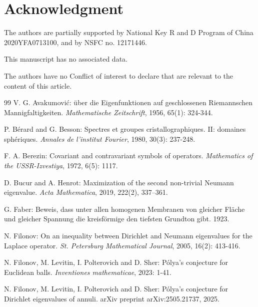 \documentclass[11pt,letterpaper]{amsart}
\numberwithin{equation}{section}
\theoremstyle{plain}
\theoremstyle{plain}
\numberwithin{equation}{section}
\theoremstyle{remark}
\begin{document}
\section*{Acknowledgment}

 The authors are partially supported by  National Key R and D Program of China 2020YFA0713100, and by NSFC no. 12171446.

 This manuscript has no associated data.

  The authors have no Conflict of interest to declare that are relevant to the content of this article.



\begin{thebibliography}{99}
	V. G. Avakumovi{\'c}: {\"u}ber die Eigenfunktionen auf geschlossenen Riemannschen Mannigfaltigkeiten. \emph{Mathematische Zeitschrift}, 1956, 65(1): 324-344.
	
	P. B\'erard and G. Besson: Spectres et groupes cristallographiques. II: domaines sph\'eriques. \emph{Annales de l'institut Fourier}, 1980, 30(3): 237-248.
	
	F. A. Berezin: Covariant and contravariant symbols of operators. \emph{Mathematics of the USSR-Izvestiya}, 1972, 6(5): 1117.
	
	D. Bucur and A. Henrot: Maximization of the second non-trivial Neumann eigenvalue. \emph{Acta Mathematica}, 2019, 222(2), 337–361.
	
	G. Faber: Beweis, dass unter allen homogenen Membranen von gleicher Fl\"ache und gleicher Spannung die kreisf\"ormige den tiefsten Grundton gibt. 1923.
	
	N. Filonov: On an inequality between Dirichlet and Neumann eigenvalues for the Laplace operator. \emph{St. Petersburg Mathematical Journal}, 2005, 16(2): 413-416.
	
	N. Filonov, M. Levitin, I. Polterovich and D. Sher: P\'olya’s conjecture for Euclidean balls. \emph{Inventiones mathematicae}, 2023: 1-41.
	
	N. Filonov, M. Levitin, I. Polterovich and D. Sher: P\'{o}lya's conjecture for Dirichlet eigenvalues of annuli. arXiv preprint arXiv:2505.21737, 2025.
	
	

\end{thebibliography}
\end{document}
